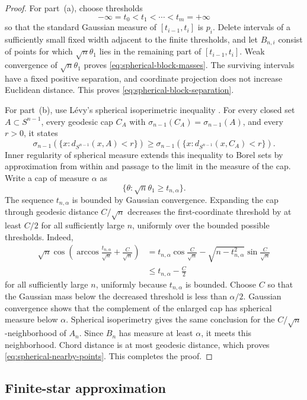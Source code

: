\documentclass[10pt,a4paper]{amsart}
\numberwithin{equation}{section}
\begin{document}
\begin{proof}
For part~\textup{(a)}, choose thresholds
\[ -\infty=t_0<t_1<\cdots<t_m=+\infty \]
so that the standard Gaussian measure of $[t_{i-1},t_i]$ is $p_i$.  Delete intervals of a sufficiently small fixed width adjacent to the finite thresholds, and let $B_{n,i}$ consist of points for which $\sqrt n\theta_1$ lies in the remaining part of $[t_{i-1},t_i]$.  Weak convergence of $\sqrt n\theta_1$ proves \eqref{eq:spherical-block-masses}.  The surviving intervals have a fixed positive separation, and coordinate projection does not increase Euclidean distance.  This proves \eqref{eq:spherical-block-separation}.

For part~\textup{(b)}, use L\'evy's spherical isoperimetric inequality \cite[Theorem~2.3]{shioya2016mmg}.  For every closed set $A\subset S^{n-1}$, every geodesic cap $C_A$ with $\sigma_{n-1}(C_A)=\sigma_{n-1}(A)$, and every $r>0$, it states
\[ \sigma_{n-1}(\{x\colon d_{S^{n-1}}(x,A)<r\})\ge\sigma_{n-1}(\{x\colon d_{S^{n-1}}(x,C_A)<r\}). \]
Inner regularity of spherical measure extends this inequality to Borel sets by approximation from within and passage to the limit in the measure of the cap. Write a cap of measure $\alpha$ as
\[ \{\theta\colon\sqrt n\theta_1\ge t_{n,\alpha}\}. \]
The sequence $t_{n,\alpha}$ is bounded by Gaussian convergence.  Expanding the cap through geodesic distance $C/\sqrt n$ decreases the first-coordinate threshold by at least $C/2$ for all sufficiently large $n$, uniformly over the bounded possible thresholds.  Indeed,
\[
 \begin{aligned}
 \sqrt n\cos\left(\arccos\frac{t_{n,\alpha}}{\sqrt n}+\frac{C}{\sqrt n}\right)
 &=t_{n,\alpha}\cos\frac{C}{\sqrt n}
 -\sqrt{n-t_{n,\alpha}^2}\sin\frac{C}{\sqrt n}\\
 &\le t_{n,\alpha}-\frac C2
 \end{aligned}
\]
for all sufficiently large $n$, uniformly because $t_{n,\alpha}$ is bounded.  Choose $C$ so that the Gaussian mass below the decreased threshold is less than $\alpha/2$.  Gaussian convergence shows that the complement of the enlarged cap has spherical measure below $\alpha$.  Spherical isoperimetry gives the same conclusion for the $C/\sqrt n$-neighborhood of $A_n$.  Since $B_n$ has measure at least $\alpha$, it meets this neighborhood.  Chord distance is at most geodesic distance, which proves \eqref{eq:spherical-nearby-points}.  This completes the proof.
\end{proof}

\subsection{Finite-star approximation}
\end{document}
